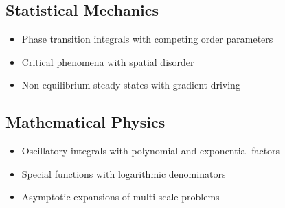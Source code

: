 \documentclass[12pt]{article}
\begin{document}
\subsection{Statistical Mechanics}
\begin{itemize}[leftmargin=*]
\item Phase transition integrals with competing order parameters
\item Critical phenomena with spatial disorder
\item Non-equilibrium steady states with gradient driving
\end{itemize}

\subsection{Mathematical Physics}
\begin{itemize}[leftmargin=*]
\item Oscillatory integrals with polynomial and exponential factors
\item Special functions with logarithmic denominators
\item Asymptotic expansions of multi-scale problems
\end{itemize}
\end{document}
